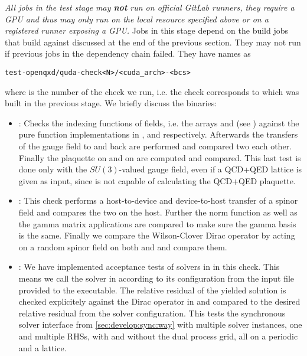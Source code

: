 \emph{All jobs in the test stage may \textbf{not} run on official GitLab runners, they require a GPU and thus may only run on the local resource specified above or on a registered runner exposing a GPU.}
Jobs in this stage depend on the build jobs that build \openqxd against \quda discussed at the end of the previous section.
They may not run if previous jobs in the dependency chain failed.
They have names as
\begin{verbatim}
test-openqxd/quda-check<N>/<cuda_arch>-<bcs>
\end{verbatim}
where  is the number of the check we run, i.e. the check corresponds to  which was built in the previous stage.
We briefly discuss the binaries:
\begin{itemize}
  \item {}: Checks the indexing functions of fields, i.e. the arrays  and  (see ) against the pure function implementations in \quda,  and  respectively. Afterwards the transfers of the gauge field to \quda and back are performed and compared two each other. Finally the plaquette on \quda and on \openqxd are computed and compared. This last test is done only with the $SU(3)$-valued gauge field, even if a QCD+QED lattice is given as input, since \quda is not capable of calculating the QCD+QED plaquette.
  \item {}: This check performs a host-to-device and device-to-host transfer of a spinor field and compares the two on the host. Further the norm function as well as the gamma matrix applications are compared to make sure the gamma basis is the same. Finally we compare the Wilson-Clover Dirac operator by acting on a random spinor field on both \openqxd and \quda and compare them.
  \item {}: We have implemented acceptance tests of solvers in \quda in this check. This means we call the solver in \quda according to its configuration from the input file provided to the executable. The relative residual of the yielded solution is checked explicitely against the Dirac operator in \openqxd and compared to the desired relative residual from the solver configuration. This tests the synchronous solver interface from \cref{sec:develop:sync:way} with multiple solver instances, one and multiple RHSs, with and without the dual process grid, all on a periodic and a \Cstar lattice.

\end{itemize}
